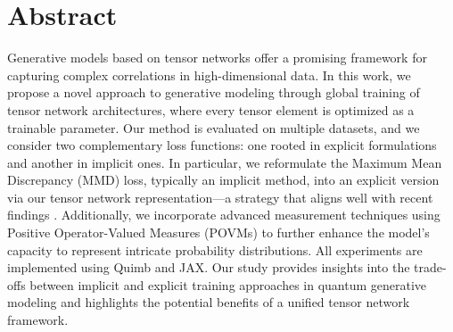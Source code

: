 \chapter*{Abstract}
Generative models based on tensor networks offer a promising framework for capturing complex correlations in high-dimensional data. In this work, we propose a novel approach to generative modeling through global training of tensor network architectures, where every tensor element is optimized as a trainable parameter. Our method is evaluated on multiple datasets, and we consider two complementary loss functions: one rooted in explicit formulations and another in implicit ones. In particular, we reformulate the Maximum Mean Discrepancy (MMD) loss, typically an implicit method, into an explicit version via our tensor network representation—a strategy that aligns well with recent findings \cite{rudolph_trainability_2024}. Additionally, we incorporate advanced measurement techniques using Positive Operator-Valued Measures (POVMs) to further enhance the model’s capacity to represent intricate probability distributions. All experiments are implemented using Quimb and JAX. Our study provides insights into the trade-offs between implicit and explicit training approaches in quantum generative modeling and highlights the potential benefits of a unified tensor network framework.

